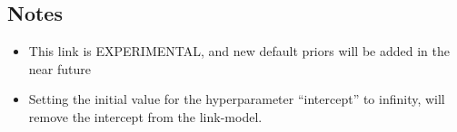 \documentclass[a4paper,11pt]{article}
\begin{document}

    
\subsection*{Notes}

\begin{itemize}
\item This link is EXPERIMENTAL, and new default priors will be added
    in the near future
\item Setting the initial value for the hyperparameter ``intercept''
    to infinity, will remove the intercept from the link-model.
\end{itemize}
\end{document}
